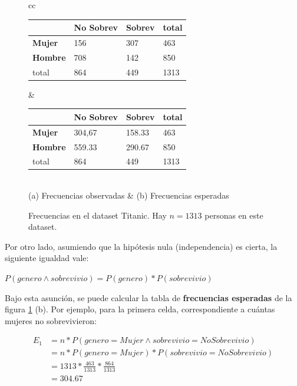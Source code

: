 \begin{figure}[h!]
\begin{tabular}{cc}

\begin{tabular}{|l|l|l|l|}
\hline
                    & \textbf{No Sobrev} & \textbf{Sobrev} & total \\ \hline
\textbf{Mujer}      & 156              & 307             & 463    \\ \hline
\textbf{Hombre}     & 708              & 142             & 850    \\ \hline
total               & 864              & 449             & 1313   \\ \hline
\end{tabular}


 &   
 
 \begin{tabular}{|l|l|l|l|}
\hline
                    & \textbf{No Sobrev} & \textbf{Sobrev} & total \\ \hline
\textbf{Mujer}      & 304,67           & 158.33          & 463    \\ \hline
\textbf{Hombre}     & 559.33              & 290.67             & 850    \\ \hline
total               & 864              & 449             & 1313   \\ \hline
\end{tabular}
 \\
(a) Frecuencias observadas & (b) Frecuencias esperadas
\end{tabular}
\caption{Frecuencias en el dataset Titanic. Hay $n=1313$ personas en este dataset.}
\label{fig:chi2_titanic_freq}
\end{figure}


Por otro lado, asumiendo que la hipótesis nula (independencia) es cierta, la siguiente igualdad vale:

\begin{center}
 $P(genero \wedge sobrevivio) = P(genero) * P(sobrevivio)$
\end{center}
 
Bajo esta asunción, se puede calcular la tabla de  \textbf{frecuencias esperadas} de la figura \ref{fig:chi2_titanic_freq} (b). Por ejemplo, para la primera celda, correspondiente a cuántas mujeres no sobrevivieron:

\begin{align*}
  E_1 & = n   * P(genero=Mujer \wedge sobrevivio=NoSobrevivio) \\
      & = n   * P(genero=Mujer) * P(sobrevivio=NoSobrevivio) \\
      & = 1313 * \frac{463}{1313} * \frac{864}{1313} \\
      & = 304.67
\end{align*}

